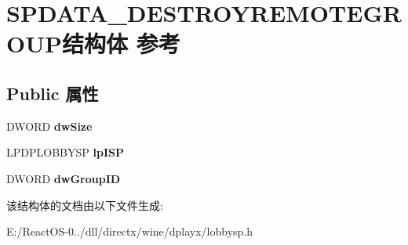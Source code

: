 \hypertarget{struct_s_p_d_a_t_a___d_e_s_t_r_o_y_r_e_m_o_t_e_g_r_o_u_p}{}\section{S\+P\+D\+A\+T\+A\+\_\+\+D\+E\+S\+T\+R\+O\+Y\+R\+E\+M\+O\+T\+E\+G\+R\+O\+U\+P结构体 参考}
\label{struct_s_p_d_a_t_a___d_e_s_t_r_o_y_r_e_m_o_t_e_g_r_o_u_p}
\subsection*{Public 属性}
\begin{DoxyCompactItemize}
\item 
\mbox{\label{struct_s_p_d_a_t_a___d_e_s_t_r_o_y_r_e_m_o_t_e_g_r_o_u_p_a1dbe411fe0b2c784c37628ea712d266f}} 
D\+W\+O\+RD {\bfseries dw\+Size}
\item 
\mbox{\label{struct_s_p_d_a_t_a___d_e_s_t_r_o_y_r_e_m_o_t_e_g_r_o_u_p_a846c4591ad890a3734c51779404f63a4}} 
L\+P\+D\+P\+L\+O\+B\+B\+Y\+SP {\bfseries lp\+I\+SP}
\item 
\mbox{\label{struct_s_p_d_a_t_a___d_e_s_t_r_o_y_r_e_m_o_t_e_g_r_o_u_p_aec4e67761a8b739a6a864baf88eccabc}} 
D\+W\+O\+RD {\bfseries dw\+Group\+ID}
\end{DoxyCompactItemize}


该结构体的文档由以下文件生成\+:\begin{DoxyCompactItemize}
\item 
E\+:/\+React\+O\+S-\/0../dll/directx/wine/dplayx/lobbysp.\+h\end{DoxyCompactItemize}
